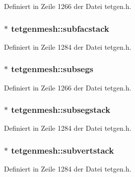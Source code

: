 Definiert in Zeile 1266 der Datei tetgen.\-h.

\hypertarget{classtetgenmesh_aff204d7120964b025cda00d2f937536b}{
\subsubsection[{subfacstack}]{ $\ast$ tetgenmesh\-::subfacstack}}\label{classtetgenmesh_aff204d7120964b025cda00d2f937536b}


Definiert in Zeile 1284 der Datei tetgen.\-h.

\hypertarget{classtetgenmesh_a1a6e03af9ec55a3366aea8f7e39c67ed}{
\subsubsection[{subsegs}]{ $\ast$ tetgenmesh\-::subsegs}}\label{classtetgenmesh_a1a6e03af9ec55a3366aea8f7e39c67ed}


Definiert in Zeile 1266 der Datei tetgen.\-h.

\hypertarget{classtetgenmesh_a44761245af7a62c50f35476b1ee5db28}{
\subsubsection[{subsegstack}]{$\ast$ tetgenmesh\-::subsegstack}}\label{classtetgenmesh_a44761245af7a62c50f35476b1ee5db28}


Definiert in Zeile 1284 der Datei tetgen.\-h.

\hypertarget{classtetgenmesh_ad27e70e870354da31dad1eb8219c521f}{
\subsubsection[{subvertstack}]{ $\ast$ tetgenmesh\-::subvertstack}}\label{classtetgenmesh_ad27e70e870354da31dad1eb8219c521f}


Definiert in Zeile 1284 der Datei tetgen.\-h.

